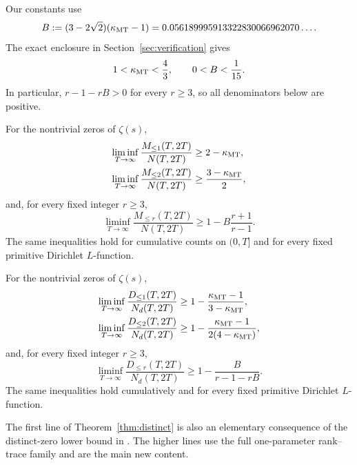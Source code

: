 Our constants use
\begin{equation}\label{eq:Bdef}
B:=(3-2\sqrt2)(\kappa_{\mathrm{MT}}-1)
=0.056189995913322830066962070\ldots.
\end{equation}
The exact enclosure in Section~\ref{sec:verification} gives
\begin{equation}\label{eq:basicbounds}
1<\kappa_{\mathrm{MT}}<\frac43,
\qquad
0<B<\frac1{15}.
\end{equation}
In particular, $r-1-rB>0$ for every $r\geq3$, so all denominators below are positive.

\begin{theorem}\label{thm:multiset}
For the nontrivial zeros of $\zeta(s)$,
\begin{align}
\liminf_{T\to\infty}\frac{M_{\leq1}(T,2T)}{N(T,2T)}
&\geq 2-\kappa_{\mathrm{MT}},\label{eq:M1}\\
\liminf_{T\to\infty}\frac{M_{\leq2}(T,2T)}{N(T,2T)}
&\geq \frac{3-\kappa_{\mathrm{MT}}}{2},\label{eq:M2}
\end{align}
and, for every fixed integer $r\geq3$,
\begin{equation}\label{eq:Mr}
\liminf_{T\to\infty}\frac{M_{\leq r}(T,2T)}{N(T,2T)}
\geq 1-B\frac{r+1}{r-1}.
\end{equation}
The same inequalities hold for cumulative counts on $(0,T]$ and for every fixed primitive Dirichlet $L$-function.
\end{theorem}

\begin{theorem}\label{thm:distinct}
For the nontrivial zeros of $\zeta(s)$,
\begin{align}
\liminf_{T\to\infty}\frac{D_{\leq1}(T,2T)}{N_d(T,2T)}
&\geq 1-\frac{\kappa_{\mathrm{MT}}-1}{3-\kappa_{\mathrm{MT}}},\label{eq:D1}\\
\liminf_{T\to\infty}\frac{D_{\leq2}(T,2T)}{N_d(T,2T)}
&\geq 1-\frac{\kappa_{\mathrm{MT}}-1}{2(4-\kappa_{\mathrm{MT}})},\label{eq:D2}
\end{align}
and, for every fixed integer $r\geq3$,
\begin{equation}\label{eq:Dr}
\liminf_{T\to\infty}\frac{D_{\leq r}(T,2T)}{N_d(T,2T)}
\geq 1-\frac{B}{r-1-rB}.
\end{equation}
The same inequalities hold cumulatively and for every fixed primitive Dirichlet $L$-function.
\end{theorem}

The first line of Theorem~\ref{thm:distinct} is also an elementary consequence of the distinct-zero lower bound in \cite{Claude2026}.  The higher lines use the full one-parameter rank--trace family and are the main new content.

